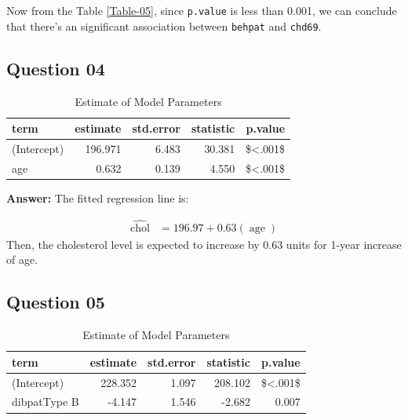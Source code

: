 \documentclass[
  12pt,
  oneside]{article}
\begin{document}
Now from the Table \ref{Table-05}, since \texttt{p.value} is less than 0.001, we can conclude that there's an significant association between \texttt{behpat} and \texttt{chd69}.

\clearpage

\hypertarget{question-04}{%
\subsection{Question 04}\label{question-04}}

\begin{table}[H]

\caption{\label{tab:Table-06}Estimate of Model Parameters}
\centering
\begin{tabular}[t]{lrrrr}
\toprule
term & estimate & std.error & statistic & p.value\\
\midrule
(Intercept) & 196.971 & 6.483 & 30.381 & \$<.001\$\\
age & 0.632 & 0.139 & 4.550 & \$<.001\$\\
\bottomrule
\end{tabular}
\end{table}

\textbf{Answer:} The fitted regression line is:

\begin{equation}
\label{eq: eq1}
\begin{aligned}
\operatorname{\widehat{chol}} &= 196.97 + 0.63(\operatorname{age})
\end{aligned}
\end{equation}
Then, the cholesterol level is expected to increase by 0.63 units
for 1-year increase of age.

\hypertarget{question-05}{%
\subsection{Question 05}\label{question-05}}

\begin{table}[H]

\caption{\label{tab:Table-07}Estimate of Model Parameters}
\centering
\begin{tabular}[t]{lrrrr}
\toprule
term & estimate & std.error & statistic & p.value\\
\midrule
(Intercept) & 228.352 & 1.097 & 208.102 & \$<.001\$\\
dibpatType B & -4.147 & 1.546 & -2.682 & 0.007\\
\bottomrule
\end{tabular}
\end{table}
\end{document}
